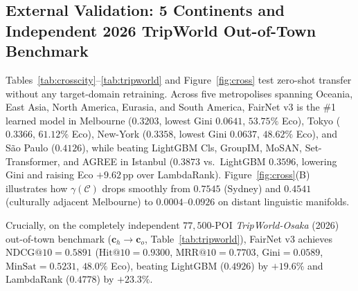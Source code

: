 \documentclass[final,5p,twocolumn]{elsarticle}
\begin{document}
\subsection{External Validation: 5 Continents and Independent 2026 TripWorld Out-of-Town Benchmark}
Tables~\ref{tab:crosscity}--\ref{tab:tripworld} and Figure~\ref{fig:cross} test zero-shot transfer without any target-domain retraining. Across five metropolises spanning Oceania, East Asia, North America, Eurasia, and South America, FairNet v3 is the \#1 learned model in Melbourne ($0.3203$, lowest Gini $0.0641$, $53.75\%$ Eco), Tokyo ($0.3366$, $61.12\%$ Eco), New-York ($0.3358$, lowest Gini $0.0637$, $48.62\%$ Eco), and S\~{a}o Paulo ($0.4126$), while beating LightGBM Cls, GroupIM, MoSAN, Set-Transformer, and AGREE in Istanbul ($0.3873$ vs.\ LightGBM $0.3596$, lowering Gini and raising Eco $+9.62$\,pp over LambdaRank). Figure~\ref{fig:cross}(B) illustrates how $\gamma(\mathcal{C})$ drops smoothly from $0.7545$ (Sydney) and $0.4541$ (culturally adjacent Melbourne) to $0.0004$--$0.0926$ on distant linguistic manifolds.

Crucially, on the completely independent $77{,}500$-POI \textit{TripWorld-Osaka} (2026) out-of-town benchmark ($\mathbf{c}_h \to \mathbf{c}_o$, Table~\ref{tab:tripworld}), FairNet v3 achieves $\text{NDCG@10} = \mathbf{0.5891}$ ($\text{Hit@10} = 0.9300$, $\text{MRR@10} = 0.7703$, $\text{Gini} = 0.0589$, $\text{MinSat} = 0.5231$, $48.0\%$ Eco), beating LightGBM ($0.4926$) by $+19.6\%$ and LambdaRank ($0.4778$) by $+23.3\%$.
\end{document}
